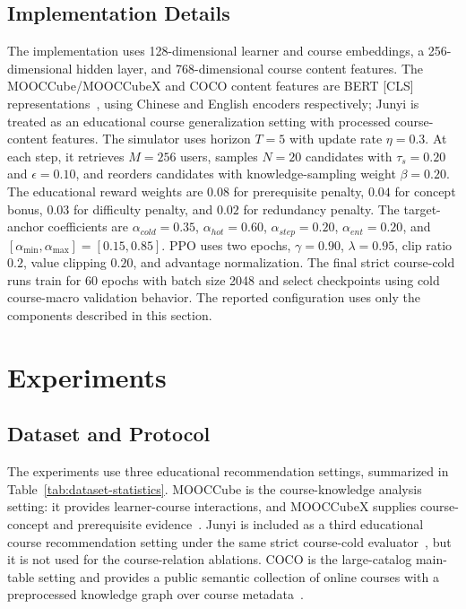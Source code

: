 \documentclass[letterpaper]{article}
\begin{document}
\subsection{Implementation Details}
The implementation uses 128-dimensional learner and course embeddings, a 256-dimensional hidden layer, and 768-dimensional course content features. The MOOCCube/MOOCCubeX and COCO content features are BERT [CLS] representations~\cite{devlin2019bert}, using Chinese and English encoders respectively; Junyi is treated as an educational course generalization setting with processed course-content features. The simulator uses horizon \(T=5\) with update rate \(\eta=0.3\). At each step, it retrieves \(M=256\) users, samples \(N=20\) candidates with \(\tau_s=0.20\) and \(\epsilon=0.10\), and reorders candidates with knowledge-sampling weight \(\beta=0.20\). The educational reward weights are \(0.08\) for prerequisite penalty, \(0.04\) for concept bonus, \(0.03\) for difficulty penalty, and \(0.02\) for redundancy penalty. The target-anchor coefficients are \(\alpha_{cold}=0.35\), \(\alpha_{hot}=0.60\), \(\alpha_{step}=0.20\), \(\alpha_{ent}=0.20\), and \([\alpha_{\min},\alpha_{\max}]=[0.15,0.85]\). PPO uses two epochs, \(\gamma=0.90\), \(\lambda=0.95\), clip ratio \(0.2\), value clipping \(0.20\), and advantage normalization. The final strict course-cold runs train for 60 epochs with batch size 2048 and select checkpoints using cold course-macro validation behavior. The reported configuration uses only the components described in this section.

\section{Experiments}
\subsection{Dataset and Protocol}
The experiments use three educational recommendation settings, summarized in Table~\ref{tab:dataset-statistics}. MOOCCube is the course-knowledge analysis setting: it provides learner-course interactions, and MOOCCubeX supplies course-concept and prerequisite evidence~\cite{yu2020mooccube,wang2021mooccubex}. Junyi is included as a third educational course recommendation setting under the same strict course-cold evaluator~\cite{chen2020junyi}, but it is not used for the course-relation ablations. COCO is the large-catalog main-table setting and provides a public semantic collection of online courses with a preprocessed knowledge graph over course metadata~\cite{dessi2018coco}.
\end{document}
